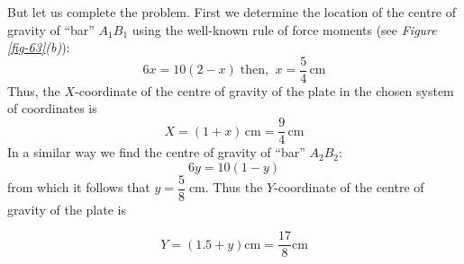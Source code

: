 \documentclass[a4paper,sfsidenotes]{tufte-book}
\begin{document}
But let us complete the problem. First we determine the location of the centre of gravity of ``bar'' $A_{1}B_{1}$ using the well-known rule of force moments  (see \emph{Figure \ref{fig-63}(b)}): 
\begin{equation*}%
6x= 10(2-x) \; \text{then,} \;\; x=\dfrac{5}{4} \, \si{\centi\meter}
\end{equation*}
Thus, the $X$-coordinate of the centre of gravity of the plate in the chosen system of coordinates is 
\begin{equation*}%
X = (1 +x) \, \si{\centi\meter}= \frac{9}{4} \, \si{\centi\meter}
\end{equation*}
In a similar way we find the centre of gravity of ``bar'' $A_{2}B_{2}$:\\
 \begin{equation*}
 6y=10(1-y)
\end{equation*}
 from which it follows that $y=\dfrac{5}{8} \; \si{\centi\meter}$. Thus the $Y$-coordinate of the centre of gravity of the plate is 

\begin{equation*}%
Y = (1.5+y) \si{\centi\meter}= \frac{17}{8} \si{\centi\meter}
\end{equation*}
\end{document}
